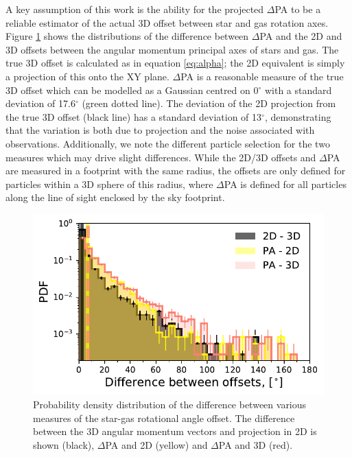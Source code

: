 A key assumption of this work is the ability for the projected $\Delta$PA to be a reliable estimator of the actual 3D offset between star and gas rotation axes. Figure \ref{fig:PA_residual} shows the distributions of the difference between $\Delta$PA and the 2D and 3D offsets between the angular momentum principal axes of stars and gas. The true 3D offset is calculated as in equation \ref{eq:alpha}; the 2D equivalent is simply a projection of this onto the XY plane. $\Delta$PA is a reasonable measure of the true 3D offset which can be modelled as a Gaussian centred on 0$^{\circ}$ with a standard deviation of 17.6$^{\circ}$ (green dotted line). The deviation of the 2D projection from the true 3D offset (black line) has a standard deviation of 13$^{\circ}$, demonstrating that the variation is both due to projection and the noise associated with observations. Additionally, we note the different particle selection for the two measures which may drive slight differences. While the 2D/3D offsets and $\Delta$PA are measured in a footprint with the same radius, the offsets are only defined for particles within a 3D sphere of this radius, where $\Delta$PA is defined for all particles along the line of sight enclosed by the sky footprint. 

\begin{figure}
    \centering
	\includegraphics[width=0.7\linewidth]{misalignment_TNG/PA_alpha_resid_hist.pdf}
    \caption{Probability density distribution of the difference between various measures of the star-gas rotational angle offset. The difference between the 3D angular momentum vectors and projection in 2D is shown (black), $\Delta$PA and 2D (yellow) and $\Delta$PA and 3D (red).}
    \label{fig:PA_residual}
\end{figure}

